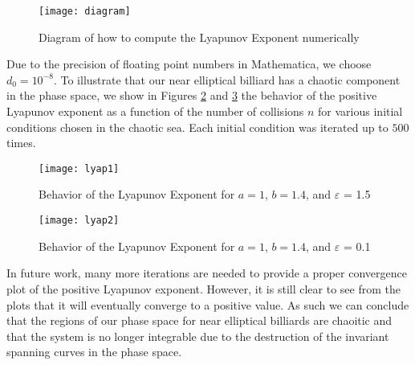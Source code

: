 \begin{figure}
    \centering
    \texttt{[image: diagram]}
    \caption{Diagram of how to compute the Lyapunov Exponent numerically}
    \label{dia}
\end{figure}
Due to the precision of floating point numbers in Mathematica, we choose $d_0 = 10^{-8}$. To illustrate that our near elliptical billiard has a chaotic component in the phase space, we show in Figures \ref{lyap1} and \ref{lyap2} the behavior of the positive Lyapunov exponent as a function of the number of collisions $n$ for various initial conditions chosen in the chaotic sea. Each initial condition was iterated up to $500$ times. 
\begin{figure}
    \centering
    \texttt{[image: lyap1]}
    \caption{Behavior of the Lyapunov Exponent for $a = 1$, $b = 1.4$, and $\varepsilon$ = 1.5}
    \label{lyap1}
\end{figure}
\begin{figure}
    \centering
    \texttt{[image: lyap2]}
    \caption{Behavior of the Lyapunov Exponent for $a = 1$, $b = 1.4$, and $\varepsilon$ = 0.1}
    \label{lyap2}
\end{figure}

In future work, many more iterations are needed to provide a proper convergence plot of the positive Lyapunov exponent. However, it is still clear to see from the plots that it will eventually converge to a positive value. As such we can conclude that the regions of our phase space for near elliptical billiards are chaoitic and that the system is no longer integrable due to the destruction of the invariant spanning curves in the phase space. 